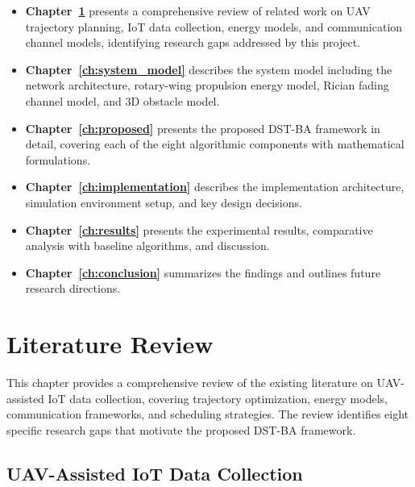 \documentclass[12pt, a4paper, oneside]{report}
\begin{document}
\begin{itemize}
    \item \textbf{Chapter~\ref{ch:literature}} presents a comprehensive review of related work on UAV trajectory planning, IoT data collection, energy models, and communication channel models, identifying research gaps addressed by this project.

    \item \textbf{Chapter~\ref{ch:system_model}} describes the system model including the network architecture, rotary-wing propulsion energy model, Rician fading channel model, and 3D obstacle model.

    \item \textbf{Chapter~\ref{ch:proposed}} presents the proposed DST-BA framework in detail, covering each of the eight algorithmic components with mathematical formulations.

    \item \textbf{Chapter~\ref{ch:implementation}} describes the implementation architecture, simulation environment setup, and key design decisions.

    \item \textbf{Chapter~\ref{ch:results}} presents the experimental results, comparative analysis with baseline algorithms, and discussion.

    \item \textbf{Chapter~\ref{ch:conclusion}} summarizes the findings and outlines future research directions.
\end{itemize}


\chapter{Literature Review}
\label{ch:literature}

This chapter provides a comprehensive review of the existing literature on UAV-assisted IoT data collection, covering trajectory optimization, energy models, communication frameworks, and scheduling strategies. The review identifies eight specific research gaps that motivate the proposed DST-BA framework.

\section{UAV-Assisted IoT Data Collection}
\end{document}
